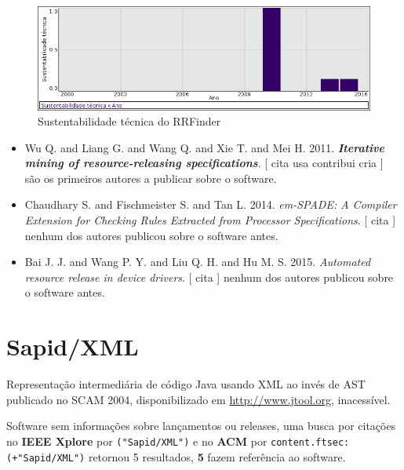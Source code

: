 \begin{figure}[h]
  \center
  \includegraphics[scale=0.50]{imagens/softwares-charts/rrfinder.png}
  \caption{Sustentabilidade técnica do RRFinder}
\end{figure}


\begin{itemize}
\item Wu Q. and Liang G. and Wang Q. and Xie T. and Mei H.
      2011.
        \textbf{\textit{ Iterative mining of resource-releasing specifications}}.
      [
          cita
          usa
          contribui
          cria
      ]
são os primeiros autores a publicar sobre o software.
\item Chaudhary S. and Fischmeister S. and Tan L.
      2014.
        \textit{ em-SPADE: A Compiler Extension for Checking Rules Extracted from Processor Specifications}.
      [
          cita
      ]
nenhum dos autores publicou sobre o software antes.
\item Bai J. J. and Wang P. Y. and Liu Q. H. and Hu M. S.
      2015.
        \textit{ Automated resource release in device drivers}.
      [
          cita
      ]
nenhum dos autores publicou sobre o software antes.
\end{itemize}
\section{Sapid/XML}

Representação intermediária de código Java usando XML ao invés de AST
publicado no SCAM 2004,
disponibilizado em \url{http://www.jtool.org},
inacessível.

Software sem informações sobre lançamentos ou releases,
uma busca por citações no {\bf IEEE Xplore} por
\texttt{("Sapid/XML")}
e no {\bf ACM} por
\texttt{content.ftsec:(+"Sapid/XML")}
retornou
5 resultados,
{\bf 5} fazem referência ao software.


